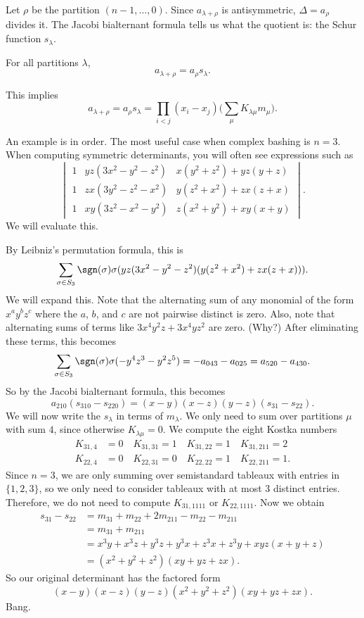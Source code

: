 \documentclass[11pt]{scrartcl}
\begin{document}
Let $\rho$ be the partition $(n - 1,\dots,0)$. Since $a_{\lambda + \rho}$ is antisymmetric, $\Delta = a_\rho$ divides it. The Jacobi bialternant formula tells us what the quotient is: the Schur function $s_\lambda$.
\begin{proposition}
	For all partitions $\lambda$,
	\[a_{\lambda + \rho} = a_\rho s_\lambda.\]
\end{proposition}
This implies
\[a_{\lambda + \rho} = a_\rho s_\lambda = \prod_{i < j}(x_i - x_j)\biggl(\sum_\mu K_{\lambda\mu}m_\mu \biggr).\]

An example is in order. The most useful case when complex bashing is $n = 3$. When computing symmetric determinants, you will often see expressions such as
\[\begin{vmatrix}
	1 & yz(3x^2 - y^2 - z^2) & x(y^2 + z^2) + yz(y + z) \\
	1 & zx(3y^2 - z^2 - x^2) & y(z^2 + x^2) + zx(z + x) \\
	1 & xy(3z^2 - x^2 - y^2) & z(x^2 + y^2) + xy(x + y)
\end{vmatrix}.\]
We will evaluate this.

By Leibniz's permutation formula, this is
\[\sum_{\sigma \in S_3} \sgn(\sigma)\sigma(yz(3x^2 - y^2 - z^2)(y(z^2 + x^2) + zx(z + x))).\]
We will expand this. Note that the alternating sum of any monomial of the form $x^ay^bz^c$ where the $a$, $b$, and $c$ are not pairwise distinct is zero. Also, note that alternating sums of terms like $3x^4y^2z + 3x^4yz^2$ are zero. (Why?) After eliminating these terms, this becomes
\[\sum_{\sigma \in S_3}\sgn(\sigma)\sigma(-y^4z^3 - y^2z^5) = -a_{043} - a_{025} = a_{520} - a_{430}.\]
So by the Jacobi bialternant formula, this becomes
\[a_{210}(s_{310} - s_{220}) = (x - y)(x - z)(y - z)(s_{31} - s_{22}).\]
We will now write the $s_\lambda$ in terms of $m_\lambda$. We only need to sum over partitions $\mu$ with sum $4$, since otherwise $K_{\lambda\mu} = 0$. We compute the eight Kostka numbers
\begin{align*}
	K_{31,4} &= 0 \quad K_{31,31} = 1 \quad K_{31,22} = 1 \quad K_{31,211} = 2 \\
	K_{22,4} &= 0 \quad K_{22,31} = 0 \quad K_{22,22} = 1 \quad K_{22,211} = 1.
\end{align*}
Since $n = 3$, we are only summing over semistandard tableaux with entries in $\{1,2,3\}$, so we only need to consider tableaux with at most $3$ distinct entries. Therefore, we do not need to compute $K_{31,1111}$ or $K_{22,1111}$. Now we obtain
\begin{align*}
	s_{31} - s_{22} &= m_{31} + m_{22} + 2m_{211} - m_{22} - m_{211} \\
	&= m_{31} + m_{211} \\
	&= x^3y + x^3z + y^3z + y^3x + z^3x + z^3y + xyz(x + y + z) \\
	&= (x^2 + y^2 + z^2)(xy + yz + zx).
\end{align*}
So our original determinant has the factored form
\[(x - y)(x - z)(y - z)(x^2 + y^2 + z^2)(xy + yz + zx).\]
Bang.
\end{document}
